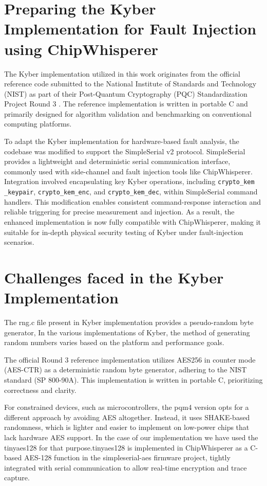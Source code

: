 \section{Preparing the Kyber Implementation for Fault Injection using ChipWhisperer}
The Kyber implementation utilized in this work originates from the official reference code submitted to the National Institute of Standards and Technology (NIST) as part of their Post-Quantum Cryptography (PQC) Standardization Project Round 3 \cite{nistpqc2020}. The reference implementation is written in portable C and primarily designed for algorithm validation and benchmarking on conventional computing platforms.

To adapt the Kyber implementation for hardware-based fault analysis, the codebase was modified to support the SimpleSerial v2 protocol. SimpleSerial provides a lightweight and deterministic serial communication interface, commonly used with side-channel and fault injection tools like ChipWhisperer. Integration involved encapsulating key Kyber operations, including \texttt{crypto\_kem
\_keypair}, \texttt{crypto\_kem\_enc}, and \texttt{crypto\_kem\_dec}, within SimpleSerial command handlers. This modification enables consistent command-response interaction and reliable triggering for precise measurement and injection. As a result, the enhanced implementation is now fully compatible with ChipWhisperer, making it suitable for in-depth physical security testing of Kyber under fault-injection scenarios.

\section{Challenges faced in the Kyber Implementation}
The rng.c file present in Kyber implementation provides a pseudo-random byte generator,
In the various implementations of Kyber, the method of generating random numbers varies based on the platform and performance goals. 

The official Round 3 reference implementation utilizes AES256 in counter mode (AES-CTR) as a deterministic random byte generator, adhering to the NIST standard (SP 800-90A). This implementation is written in portable C, prioritizing correctness and clarity.

For constrained devices, such as microcontrollers, the pqm4 version opts for a different approach by avoiding AES altogether. Instead, it uses SHAKE-based randomness, which is lighter and easier to implement on low-power chips that lack hardware AES support.
In the case of our implementation we have used the tinyaes128 for that purpose.tinyaes128 is implemented in ChipWhisperer as a C-based AES-128 function in the simpleserial-aes firmware project, tightly integrated with serial communication to allow real-time encryption and trace capture.

